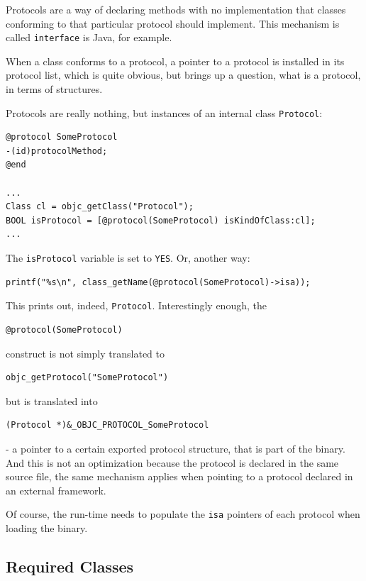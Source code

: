 Protocols are a way of declaring methods with no implementation that classes conforming to that particular protocol should implement. This mechanism is called \verb=interface= is Java, for example.

When a class conforms to a protocol, a pointer to a protocol is installed in its protocol list, which is quite obvious, but brings up a question, what is a protocol, in terms of structures.

Protocols are really nothing, but instances of an internal class \verb=Protocol=:

\begin{verbatim}
@protocol SomeProtocol
-(id)protocolMethod;
@end

...
Class cl = objc_getClass("Protocol");
BOOL isProtocol = [@protocol(SomeProtocol) isKindOfClass:cl];
...
\end{verbatim}

The \verb=isProtocol= variable is set to \verb=YES=. Or, another way:

\begin{verbatim}
printf("%s\n", class_getName(@protocol(SomeProtocol)->isa));
\end{verbatim}

This prints out, indeed, \verb=Protocol=. Interestingly enough, the

\begin{verbatim}@protocol(SomeProtocol)\end{verbatim}
  
construct is not simply translated to

\begin{verbatim}objc_getProtocol("SomeProtocol")\end{verbatim}

but is translated into 

\begin{verbatim}(Protocol *)&_OBJC_PROTOCOL_SomeProtocol\end{verbatim}

- a pointer to a certain exported protocol structure, that is part of the binary. And this is not an optimization because the protocol is declared in the same source file, the same mechanism applies when pointing to a protocol declared in an external framework.

Of course, the run-time needs to populate the \verb=isa= pointers of each protocol when loading the binary.

\subsection{Required Classes}

